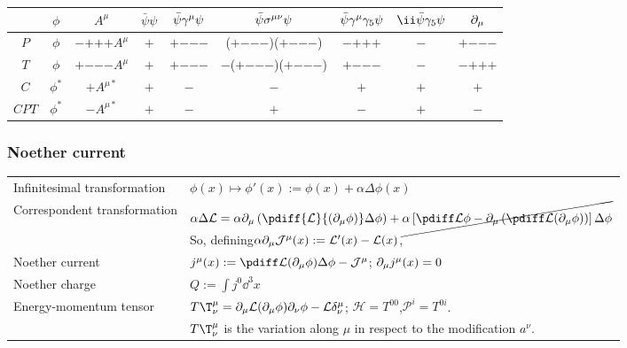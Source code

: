 \hspace{1zw}

\begin{tabular}[t]{c|c|c|cccccc}
 & $\phi$ & $A^\mu$
 & $\bar\psi\psi$ & $\bar\psi\gamma^{\mu}\psi$ & $\bar\psi\sigma^{\mu\nu}\psi$
 & $\bar\psi\Gm\G5\psi$ & $\ii\bar\psi\G5\psi$ & $\partial_\mu$\\\hline
$P$
  & $\phi$ & $-$$+$$+$$+$$A^\mu$
  &$+$&$+$$-$$-$$-$&($+$$-$$-$$-$)($+$$-$$-$$-$)&$-$$+$$+$$+$&$-$&$+$$-$$-$$-$\\
$T$
  & $\phi$ & $+$$-$$-$$-$$A^\mu$
  &$+$&$+$$-$$-$$-$&$-$($+$$-$$-$$-$)($+$$-$$-$$-$)&$+$$-$$-$$-$&$-$&$-$$+$$+$$+$\\
$C$
  & $\phi^*$ & $+$$A^{\mu*}$
  &$+$&$-$&$-$&$+$&$+$&$+$\\
$CPT$
  & $\phi^*$ & $-$$A^{\mu*}$
  &$+$&$-$&$+$&$-$&$+$&$-$\\
\end{tabular}\vspace{.5zw}

\subsubsection{Noether current}
\begin{tabular}{l@{ :\ \ \ }l}
Infinitesimal transformation & $\phi(x)\mapsto \phi'(x):=\phi(x)+\alpha\Delta\phi(x)$\\
Correspondent transformation & $\alpha\Delta\Lag = \alpha\Pm\left(\pdiff{\Lag}{(\Pm\phi)}\Delta\phi\right)+\cancel{\alpha\left[\pdiff\Lag\phi-\Pm\left(\pdiff\Lag{(\Pm\phi)}\right)\right]\Delta\phi}$\\
                             & So, defining\quad $\alpha\partial_\mu\mathcal J^\mu(x):={\mathcal L}'(x)-{\mathcal L}(x)$,\\
Noether current              & $j^\mu(x):=\pdiff\Lag{(\Pm\phi)}\Delta\phi-\mathcal J^\mu$;\qquad
                               $\partial_\mu j^\mu(x)=0$\\
Noether charge               & $Q:=\int j^0\dd^3x$\\
Energy-momentum tensor       & $T\T^\mu_\nu=\Pm\Lag{(\Pm\phi)}\Pn\phi-\Lag\delta^\mu_\nu$;\quad
$\mathcal H=T^{00}$,\quad $\mathcal P^i =T^{0i}$.\\
&$T\T^\mu_\nu$ is the variation along $\mu$ in respect to the modification $a^\nu$.\\
\end{tabular}

\newpage


\vspace{5pt}
\onecolumn


